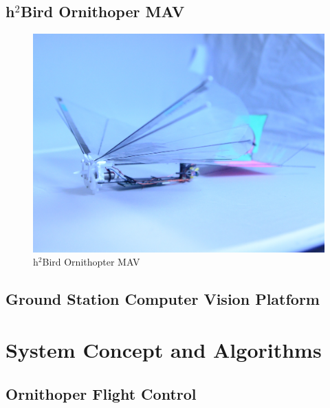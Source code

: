 \documentclass[letterpaper, 10 pt, conference]{ieeeconf}
\begin{document}
\subsection{h$^2$Bird Ornithoper MAV}
\begin{figure}[tb]
\centering
\includegraphics[width=\linewidth]{figures/h2bird.jpg}
\caption{h$^2$Bird Ornithopter MAV}
\label{fig:H2Bird}
\end{figure}


\subsection{Ground Station Computer Vision Platform}


\section{System Concept and Algorithms}

\subsection{Ornithoper Flight Control}
\end{document}
